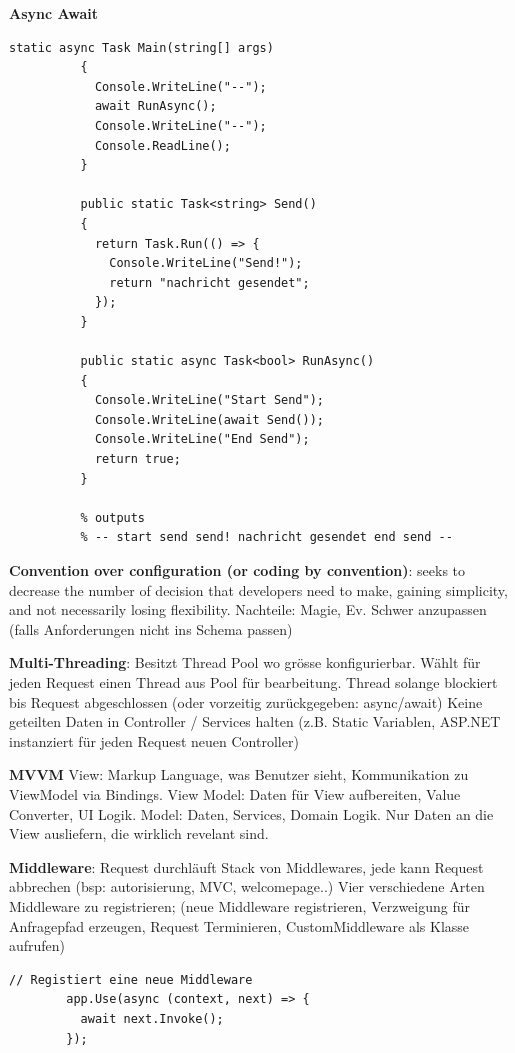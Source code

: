 \documentclass[10pt,landscape]{article}
\begin{document}
\begin{multicols}{2}
        \textbf{Async Await}
        \begin{lstlisting}[style=CSharp]
          static async Task Main(string[] args)
          {
            Console.WriteLine("--");
            await RunAsync();
            Console.WriteLine("--");
            Console.ReadLine();
          }

          public static Task<string> Send()
          {
            return Task.Run(() => {
              Console.WriteLine("Send!");
              return "nachricht gesendet";
            });
          }

          public static async Task<bool> RunAsync()
          {
            Console.WriteLine("Start Send");
            Console.WriteLine(await Send());
            Console.WriteLine("End Send");
            return true;
          }

          % outputs
          % -- start send send! nachricht gesendet end send -- 
        \end{lstlisting}

        \textbf{Convention over configuration (or coding by convention)}: seeks to decrease the number of decision that developers need to make, gaining simplicity, and not necessarily losing flexibility.
        Nachteile: Magie, Ev. Schwer anzupassen (falls Anforderungen nicht ins Schema passen)

        \textbf{Multi-Threading}: Besitzt Thread Pool wo grösse konfigurierbar. Wählt für jeden Request einen Thread aus Pool für bearbeitung.
        Thread solange blockiert bis Request abgeschlossen (oder vorzeitig zurückgegeben: async/await)
        Keine geteilten Daten in Controller / Services halten (z.B. Static Variablen, ASP.NET instanziert für jeden Request neuen Controller)

        \textbf{MVVM} View: Markup Language, was Benutzer sieht, Kommunikation zu ViewModel via Bindings.
        View Model: Daten für View aufbereiten, Value Converter, UI Logik. Model: Daten, Services, Domain Logik.
        Nur Daten an die View ausliefern, die wirklich revelant sind.

        \textbf{Middleware}: Request durchläuft Stack von Middlewares, jede kann Request abbrechen (bsp: autorisierung, MVC, welcomepage..)
        Vier verschiedene Arten Middleware zu registrieren; (neue Middleware registrieren, Verzweigung für Anfragepfad erzeugen, Request Terminieren, CustomMiddleware als Klasse aufrufen)

        \begin{lstlisting}[style=CSharp]
        // Registiert eine neue Middleware
        app.Use(async (context, next) => {
          await next.Invoke();
        });


\end{lstlisting}
\end{multicols}
\end{document}
